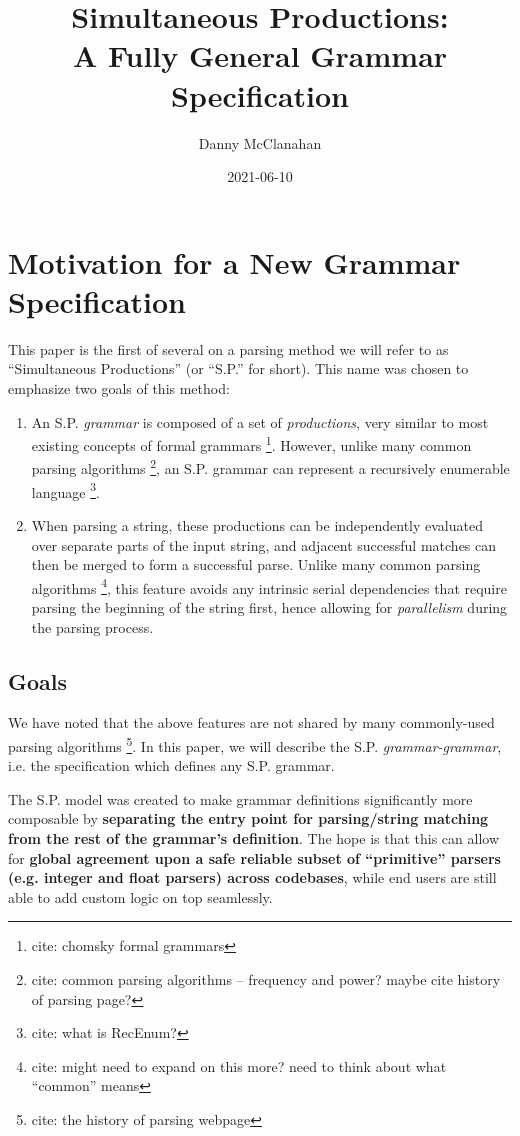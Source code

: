 \documentclass[10pt]{article}
\title{Simultaneous Productions: \\ A Fully General Grammar Specification}
\date{2021-06-10}
\author{Danny McClanahan}
\newcommand{\todocite}[1]{\footnote{cite: #1}}
\begin{document}
\maketitle
\tableofcontents

\section{Motivation for a New Grammar Specification}
\label{sec:motivation}

This paper is the first of several on a parsing method we will refer to as ``Simultaneous Productions'' (or ``S.P.'' for short). This name was chosen to emphasize two goals of this method:
\begin{enumerate}
  \item An S.P. \textit{grammar} is composed of a set of \textit{productions}, very similar to most existing concepts of formal grammars \todocite{chomsky formal grammars}. However, unlike many common parsing algorithms \todocite{common parsing algorithms -- frequency and power? maybe cite history of parsing page?}, an S.P. grammar can represent a recursively enumerable language \todocite{what is RecEnum?}.
  \item When parsing a string, these productions can be independently evaluated over separate parts of the input string, and adjacent successful matches can then be merged to form a successful parse. Unlike many common parsing algorithms \todocite{might need to expand on this more? need to think about what ``common'' means}, this feature avoids any intrinsic serial dependencies that require parsing the beginning of the string first, hence allowing for \textit{parallelism} during the parsing process.
\end{enumerate}

\subsection{Goals}
\label{sec:goals}
We have noted that the above features are not shared by many commonly-used parsing algorithms \todocite{the history of parsing webpage}. In this paper, we will describe the S.P. \textit{grammar-grammar}, i.e. the specification which defines any S.P. grammar.

The S.P. model was created to make grammar definitions significantly more composable by \textbf{separating the entry point for parsing/string matching from the rest of the grammar's definition}. The hope is that this can allow for \textbf{global agreement upon a safe reliable subset of ``primitive'' parsers (e.g. integer and float parsers) across codebases}, while end users are still able to add custom logic on top seamlessly.
\end{document}
